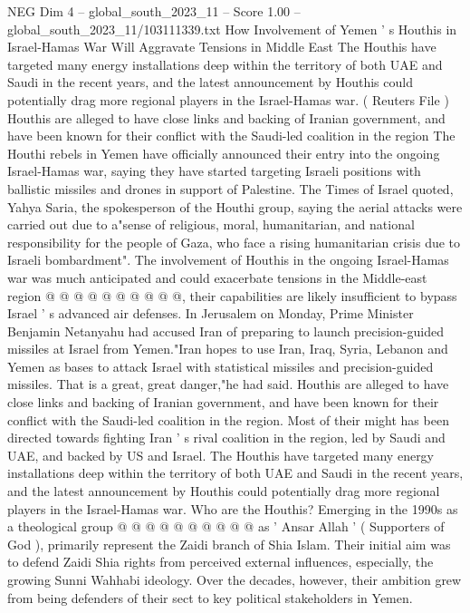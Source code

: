 \begin{textsample}{NEG Dim 4 – global\_south\_2023\_11 – Score 1.00 – global\_south\_2023\_11/103111339.txt}  \label{ex:f4_neg_308}
How Involvement of Yemen ' s Houthis in Israel-Hamas War Will Aggravate Tensions in Middle East The Houthis have targeted many energy installations deep within the territory of both UAE and Saudi in the recent years, and the latest announcement by Houthis could potentially drag more regional players in the Israel-Hamas war. ( Reuters File ) Houthis are alleged to have close links and backing of Iranian government, and have been known for their conflict with the Saudi-led coalition in the region The Houthi rebels in Yemen have officially announced their entry into the ongoing Israel-Hamas war, saying they have started targeting Israeli positions with ballistic missiles and drones in support of Palestine.
The Times of Israel quoted, Yahya Saria, the spokesperson of the Houthi group, saying the aerial attacks were carried out due to a"sense of religious, moral, humanitarian, and national responsibility for the people of Gaza, who face a rising humanitarian crisis due to Israeli bombardment".
The involvement of Houthis in the ongoing Israel-Hamas war was much anticipated and could exacerbate tensions in the Middle-east region @ @ @ @ @ @ @ @ @ @, their capabilities are likely insufficient to bypass Israel ' s advanced air defenses.
In Jerusalem on Monday, Prime Minister Benjamin Netanyahu had accused Iran of preparing to launch precision-guided missiles at Israel from Yemen."Iran hopes to use Iran, Iraq, Syria, Lebanon and Yemen as bases to attack Israel with statistical missiles and precision-guided missiles.
That is a great, great danger,"he had said.
Houthis are alleged to have close links and backing of Iranian government, and have been known for their conflict with the Saudi-led coalition in the region.
Most of their might has been directed towards fighting Iran ' s rival coalition in the region, led by Saudi and UAE, and backed by US and Israel.
The Houthis have targeted many energy installations deep within the territory of both UAE and Saudi in the recent years, and the latest announcement by Houthis could potentially drag more regional players in the Israel-Hamas war.
Who are the Houthis?
Emerging in the 1990s as a theological group @ @ @ @ @ @ @ @ @ @ as ' Ansar Allah ' ( Supporters of God ), primarily represent the Zaidi branch of Shia Islam.
Their initial aim was to defend Zaidi Shia rights from perceived external influences, especially, the growing Sunni Wahhabi ideology.
Over the decades, however, their ambition grew from being defenders of their sect to key political stakeholders in Yemen.

\end{textsample}
